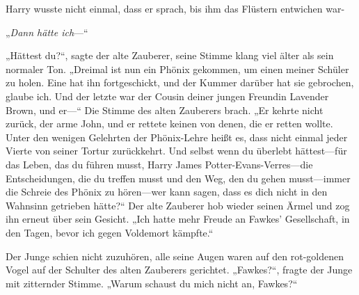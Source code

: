 Harry wusste nicht einmal, dass er sprach, bis ihm das Flüstern entwichen war-

 „\emph{Dann hätte ich}—“

„Hättest du?“, sagte der alte Zauberer, seine Stimme klang viel älter als sein normaler Ton. „Dreimal ist nun ein Phönix gekommen, um einen meiner Schüler zu holen. Eine hat ihn fortgeschickt, und der Kummer darüber hat sie gebrochen, glaube ich. Und der letzte war der Cousin deiner jungen Freundin Lavender Brown, und er—“
Die Stimme des alten Zauberers brach.
„Er kehrte nicht zurück, der arme John, und er rettete keinen von denen, die er retten wollte. Unter den wenigen Gelehrten der Phönix-Lehre heißt es, dass nicht einmal jeder Vierte von seiner Tortur zurückkehrt. Und selbst wenn du überlebt hättest—für das Leben, das du führen musst, Harry James Potter-Evans-Verres—die Entscheidungen, die du treffen musst und den Weg, den du gehen musst—immer die Schreie des Phönix zu hören—wer kann sagen, dass es dich nicht in den Wahnsinn getrieben hätte?“
Der alte Zauberer hob wieder seinen Ärmel und zog ihn erneut über sein Gesicht. „Ich hatte mehr Freude an Fawkes' Gesellschaft, in den Tagen, bevor ich gegen Voldemort kämpfte.“

Der Junge schien nicht zuzuhören, alle seine Augen waren auf den rot-goldenen Vogel auf der Schulter des alten Zauberers gerichtet.
„Fawkes?“, fragte der Junge mit zitternder Stimme. „Warum schaust du mich nicht an, Fawkes?“

